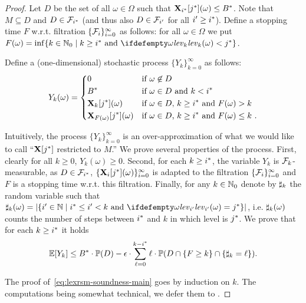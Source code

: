 \begin{proof}
Let $D$ be the set of all $\omega\in \Omega$ such that 
$\mathbf{X}_{{i}^*}[{j}^*](\omega)\leq {B}^*$. Note that $M \subseteq D$ and $D\in 
\mathcal{F}_{{i}^*}$ (and thus also $D\in \mathcal{F}_{i'}$ for all $i'\geq {i}^*$). 
Define a stopping time $F$ w.r.t. filtration $\{\mathcal{F}_i\}_{i=0}^{\infty}$ as follows: for all $\omega \in \Omega$ 
we put 
$F(\omega)=\inf\{k\in \Nset_0 \mid k\geq \fixn{i} \text{ and }
\levelrank{\omega}{k} < \fixn{j} \}$.

Define a 
(one-dimensional) stochastic process $\{Y_k\}_{k=0}^{\infty}$ as 
follows:
$$
Y_k(\omega) = \begin{dcases}
0 & \text{if $\omega \not\in D$}\\
{B}^* & \text{if $\omega \in D$ and $k<{i}^*$ }\\
\mathbf{X}_{k}[{j}^*](\omega) & \text{if $\omega \in D$, $k\geq {i}^*$ and 
$F(\omega)>k$ 
}\\
\mathbf{X}_{F(\omega)}[{j}^*](\omega) & \text{if $\omega\in D$, $k\geq 
{i}^*$ and 
$F(\omega)\leq k$ }.
\end{dcases}
$$

Intuitively, the process $\{Y_k\}_{k=0}^{\infty}$ is an over-approximation of what we would like to call ``$\mathbf{X}[{j}^*]$ restricted to $M$.''
We prove several properties of the process. 
First, clearly for all $k\geq 0$, $Y_k(\omega)\geq 0$. Second, for each $k\geq {i}^*$, the variable $Y_k$ is $\mathcal{F}_k$-measurable, as $D\in \mathcal{F}_{{i}^*}$, $\{\mathbf{X}_{i}[{j}^*](\omega)\}_{i=0}^{\infty}$ is adapted to the filtration $\{\mathcal{F}_i\}_{i=0}^{\infty}$ and $F$ is a stopping time w.r.t. this filtration. Finally, for any $k\in \mathbb{N}_0$ denote by 
$\sharp_k$ the random variable such that $\noofdec_k(\omega) = |\{i'\in 
\Nset\mid \fixn{i} \leq i' < k \text{ and } \levelrank{\omega}{i'}=\fixn{j}\} |$, i.e. $\sharp_k(\omega)$ counts the number of steps between ${i}^*$ and $k$ in which level is ${j}^*$.
We prove
that for each $k\geq {i}^*$ 
it holds 
\begin{equation}
\label{eq:lexrsm-soundness-main}
\mathbb{E}[Y_k]\leq {B}^*\cdot \mathbb{P}(D) - \epsilon\cdot\sum_{\ell=0}^{k-{i}^*} \ell\cdot\mathbb{P}(D 
\cap \{F\geq k\} \cap \{\sharp_k 
= 
\ell\}).
\end{equation}

The proof of~\eqref{eq:lexrsm-soundness-main} goes by induction on $k$. The computations being somewhat technical, we defer them to \AppendixMaterial. 


\end{proof}
